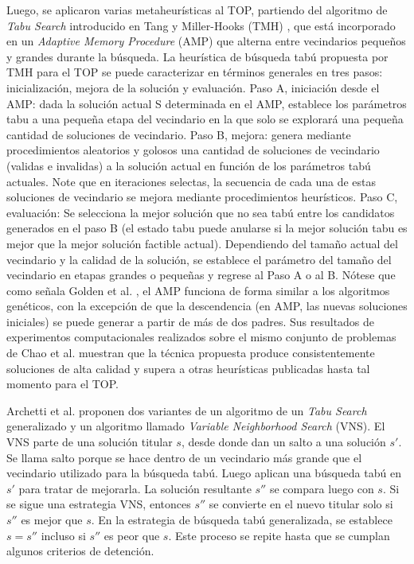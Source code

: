 \bigskip

Luego, se aplicaron varias metaheurísticas al TOP, partiendo del algoritmo de \textit{Tabu Search} introducido en Tang y Miller-Hooks (TMH) \cite{TangMillerHooks}, que está incorporado en un \textit{Adaptive Memory Procedure} (AMP) que alterna entre vecindarios pequeños y grandes durante la búsqueda. La heurística de búsqueda tabú propuesta por TMH para el TOP se puede caracterizar en términos generales en tres pasos: inicialización, mejora de la solución y evaluación. Paso A, iniciación desde el AMP: dada la solución actual S determinada en el AMP, establece los parámetros tabu a una pequeña etapa del vecindario en la que solo se explorará una pequeña cantidad de soluciones de vecindario. Paso B, mejora: genera mediante procedimientos aleatorios y golosos una cantidad de soluciones de vecindario (validas e invalidas) a la solución actual en función de los parámetros tabú actuales. Note que en iteraciones selectas, la secuencia de cada una de estas soluciones de vecindario se mejora mediante procedimientos heurísticos. Paso C, evaluación: Se selecciona la mejor solución que no sea tabú entre los candidatos generados en el paso B (el estado tabu puede anularse si la mejor solución tabu es mejor que la mejor solución factible actual). Dependiendo del tamaño actual del vecindario y la calidad de la solución, se establece el parámetro del tamaño del vecindario en etapas grandes o pequeñas y regrese al Paso A o al B. Nótese que como señala Golden et al. \cite{GoldenLaporteTaillard}, el AMP funciona de forma similar a los algoritmos genéticos, con la excepción de que la descendencia (en AMP, las nuevas soluciones iniciales) se puede generar a partir de más de dos padres. Sus resultados de experimentos computacionales realizados sobre el mismo conjunto de problemas de Chao et al. muestran que la técnica propuesta produce consistentemente soluciones de alta calidad y supera a otras heurísticas publicadas hasta tal momento para el TOP.

\bigskip

Archetti et al. \cite{ArchettiHertzSperanza} proponen dos variantes de un algoritmo de un \textit{Tabu Search} generalizado y un algoritmo llamado \textit{Variable Neighborhood Search} (VNS). El VNS parte de una solución titular $s$, desde donde dan un salto a una solución $s'$. Se llama salto porque se hace dentro de un vecindario más grande que el vecindario utilizado para la búsqueda tabú. Luego aplican una búsqueda tabú en $s'$ para tratar de mejorarla. La solución resultante $s''$ se compara luego con $s$. Si se sigue una estrategia VNS, entonces $s''$ se convierte en el nuevo titular solo si $s''$ es mejor que $s$. En la estrategia de búsqueda tabú generalizada, se establece $s = s''$ incluso si $s''$ es peor que $s$. Este proceso se repite hasta que se cumplan algunos criterios de detención.

